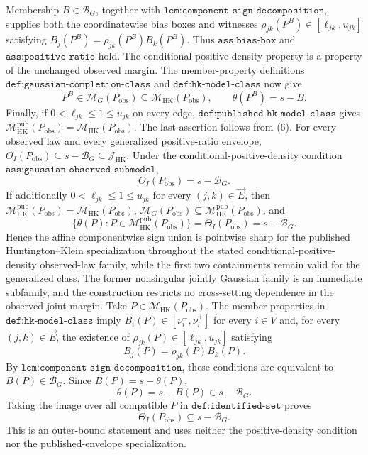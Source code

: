 Membership \(B\in\mathcal B_G\), together with \(\texttt{lem:component-sign-decomposition}\), supplies both the coordinatewise bias boxes and witnesses \(\rho_{jk}(P^B)\in[\ell_{jk},u_{jk}]\) satisfying \(B_j(P^B)=\rho_{jk}(P^B)B_k(P^B)\).  Thus \(\texttt{ass:bias-box}\) and \(\texttt{ass:positive-ratio}\) hold.  The conditional-positive-density property is a property of the unchanged observed margin.  The member-property definitions \(\texttt{def:gaussian-completion-class}\) and \(\texttt{def:hk-model-class}\) now give
\[
P^B\in\mathcal M_G(P_{\mathrm{obs}})
\subseteq\mathcal M_{\mathrm{HK}}(P_{\mathrm{obs}}),
\qquad \theta(P^B)=s-B. \tag{6}
\]
Finally, if \(0<\ell_{jk}\le1\le u_{jk}\) on every edge, \(\texttt{def:published-hk-model-class}\) gives \(\mathcal M_{\mathrm{HK}}^{\mathrm{pub}}(P_{\mathrm{obs}})=\mathcal M_{\mathrm{HK}}(P_{\mathrm{obs}})\).  The last assertion follows from (6).
For every observed law and every generalized positive-ratio envelope, \(\Theta_I(P_{\mathrm{obs}})\subseteq s-\mathcal B_G\subseteq\mathcal J_{\mathrm{HK}}\).  Under the conditional-positive-density condition \(\texttt{ass:gaussian-observed-submodel}\),
\[
\Theta_I(P_{\mathrm{obs}})=s-\mathcal B_G.
\]
If additionally \(0<\ell_{jk}\le1\le u_{jk}\) for every \((j,k)\in\vec E\), then \(\mathcal M_{\mathrm{HK}}^{\mathrm{pub}}(P_{\mathrm{obs}})=\mathcal M_{\mathrm{HK}}(P_{\mathrm{obs}})\), \(\mathcal M_G(P_{\mathrm{obs}})\subseteq\mathcal M_{\mathrm{HK}}^{\mathrm{pub}}(P_{\mathrm{obs}})\), and
\[
\{\theta(P):P\in\mathcal M_{\mathrm{HK}}^{\mathrm{pub}}(P_{\mathrm{obs}})\}
=\Theta_I(P_{\mathrm{obs}})=s-\mathcal B_G.
\]
Hence the affine componentwise sign union is pointwise sharp for the published Huntington--Klein specialization throughout the stated conditional-positive-density observed-law family, while the first two containments remain valid for the generalized class.  The former nonsingular jointly Gaussian family is an immediate subfamily, and the construction restricts no cross-setting dependence in the observed joint margin.
Take \(P\in\mathcal M_{\mathrm{HK}}(P_{\mathrm{obs}})\).  The member properties in \(\texttt{def:hk-model-class}\) imply \(B_i(P)\in[\nu_i^-,\nu_i^+]\) for every \(i\in V\) and, for every \((j,k)\in\vec E\), the existence of \(\rho_{jk}(P)\in[\ell_{jk},u_{jk}]\) satisfying
\[
B_j(P)=\rho_{jk}(P)B_k(P). \tag{1}
\]
By \(\texttt{lem:component-sign-decomposition}\), these conditions are equivalent to \(B(P)\in\mathcal B_G\).  Since \(B(P)=s-\theta(P)\),
\[
\theta(P)=s-B(P)\in s-\mathcal B_G. \tag{2}
\]
Taking the image over all compatible \(P\) in \(\texttt{def:identified-set}\) proves
\[
\Theta_I(P_{\mathrm{obs}})\subseteq s-\mathcal B_G. \tag{3}
\]
This is an outer-bound statement and uses neither the positive-density condition nor the published-envelope specialization.

